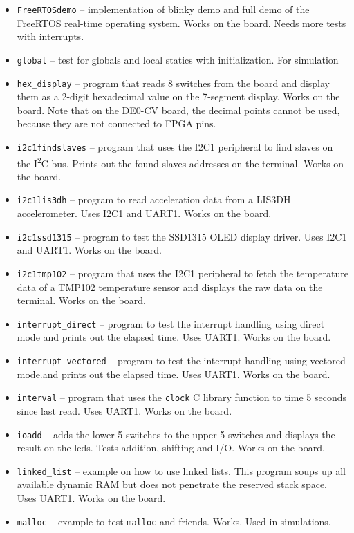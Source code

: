 \documentclass[12pt]{article}
\begin{document}
\begin{itemize}
\item \lstinline|FreeRTOSdemo| -- implementation of blinky demo and full demo of the FreeRTOS real-time operating system. Works on the board. Needs more tests with interrupts.
\item \lstinline|global| -- test for globals and local statics with initialization. For simulation
\item \lstinline|hex_display| -- program that reads 8 switches from the board and display them as a 2-digit hexadecimal value on the 7-segment display. Works on the board. Note that on the DE0-CV board, the decimal points cannot be used, because they are not connected to FPGA pins.
\item \lstinline|i2c1findslaves| -- program that uses the I2C1 peripheral to find slaves on the I\textsuperscript{2}C bus. Prints out the found slaves addresses on the terminal. Works on the board.
\item \lstinline|i2c1lis3dh| -- program to read acceleration data from a LIS3DH accelerometer. Uses I2C1 and UART1. Works on the board.
\item \lstinline|i2c1ssd1315| -- program to test the SSD1315 OLED display driver. Uses I2C1 and UART1. Works on the board.
\item \lstinline|i2c1tmp102| -- program that uses the I2C1 peripheral to fetch the temperature data of a TMP102 temperature sensor and displays the raw data on the terminal. Works on the board.
\item \lstinline|interrupt_direct| -- program to test the interrupt handling using direct mode and prints out the elapsed time. Uses UART1. Works on the board.
\item \lstinline|interrupt_vectored| -- program to test the interrupt handling using vectored mode.and prints out the elapsed time. Uses UART1. Works on the board.
\item \lstinline|interval| -- program that uses the \lstinline|clock| C library function to time 5 seconds since last read. Uses UART1. Works on the board.
\item \lstinline|ioadd| -- adds the lower 5 switches to the upper 5 switches and displays the result on the leds. Tests addition, shifting and I/O. Works on the board.
\item \lstinline|linked_list| -- example on how to use linked lists. This program soups up all available dynamic RAM but does not penetrate the reserved stack space. Uses UART1. Works on the board.
\item \lstinline|malloc| -- example to test \lstinline|malloc| and friends. Works. Used in simulations.

\end{itemize}
\end{document}

